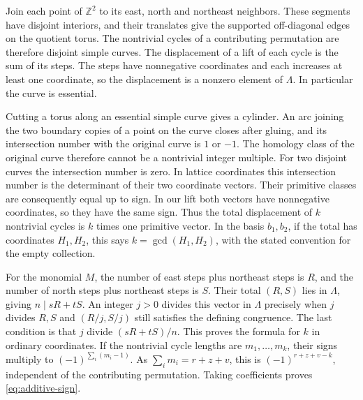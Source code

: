 \documentclass[11pt,reqno]{amsart}
\theoremstyle{remark}
\numberwithin{equation}{section}
\begin{document}
Join each point of \(\mathbb Z^2\) to its east, north and northeast
neighbors. These segments have disjoint interiors, and their translates
give the supported off-diagonal edges on the quotient torus. The
nontrivial cycles of a contributing permutation are therefore disjoint
simple curves. The displacement of a lift of each cycle is the sum of its
steps. The steps have nonnegative coordinates and each increases at least
one coordinate, so the displacement is a nonzero element of \(\Lambda\).
In particular the curve is essential.

Cutting a torus along an essential simple curve gives a cylinder. An arc
joining the two boundary copies of a point on the curve closes after
gluing, and its intersection number with the original curve is \(1\) or
\(-1\). The homology class of the original curve therefore cannot be a
nontrivial integer multiple. For two disjoint curves the intersection
number is zero. In lattice coordinates this intersection number is the
determinant of their two coordinate vectors. Their primitive classes are
consequently equal up to sign. In our lift both vectors have nonnegative
coordinates, so they have the same sign. Thus the total displacement of
\(k\) nontrivial cycles is \(k\) times one primitive vector. In the basis
\(b_1,b_2\), if the total has coordinates \(H_1,H_2\), this says
\(k=\gcd(H_1,H_2)\), with the stated convention for the empty collection.

For the monomial \(M\), the number of east steps plus northeast steps is
\(R\), and the number of north steps plus northeast steps is \(S\). Their
total \((R,S)\) lies in \(\Lambda\), giving \(n\mid sR+tS\). An integer
\(j>0\) divides this vector in \(\Lambda\) precisely when \(j\) divides
\(R,S\) and \((R/j,S/j)\) still satisfies the defining congruence. The
last condition is that \(j\) divide \((sR+tS)/n\). This proves the
formula for \(k\) in ordinary coordinates. If the nontrivial cycle
lengths are \(m_1,\ldots,m_k\), their signs multiply to
\((-1)^{\sum_i(m_i-1)}\). As \(\sum_i m_i=r+z+v\), this is
\((-1)^{r+z+v-k}\), independent of the contributing permutation. Taking
coefficients proves \eqref{eq:additive-sign}.
\end{document}
